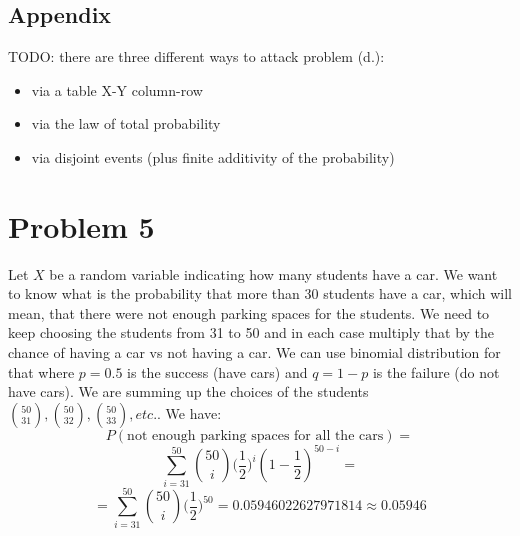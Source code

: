 \documentclass{article}
\begin{document}

\subsection*{Appendix}

TODO: there are three different ways to attack problem (d.):

\begin{itemize}
    \item via a table X-Y column-row
    \item via the law of total probability
    \item via disjoint events (plus finite additivity of the probability)
\end{itemize}

\section*{Problem 5}
Let \(X\) be a random variable indicating how many students have a car. We want to know what is the probability that more than 30 students
have a car, which will mean, that there were not enough parking spaces for the students. We need to keep choosing
the students from 31 to 50 and in each case multiply that by the chance of having a car vs not having a car. We can use
binomial distribution for that where \(p = 0.5\) is the success (have cars) and \(q = 1 - p\) is the failure (do not have cars).
We are summing up the choices of the students \(\binom{50}{31}, \binom{50}{32}, \binom{50}{33}, etc.\). We have:
\begin{equation*}
    P(\mbox{not enough parking spaces for all the cars}) =  
\end{equation*}
\begin{equation*}
    \sum_{i=31}^{50}\binom{50}{i} \Big(\frac{1}{2}\Big)^{i}(1 - \frac{1}{2})^{50 - i} = 
\end{equation*}
\begin{equation*}
    = \sum_{i=31}^{50}\binom{50}{i} \Big(\frac{1}{2}\Big)^{50} = 0.05946022627971814 \approx 0.05946
\end{equation*}
\end{document}
